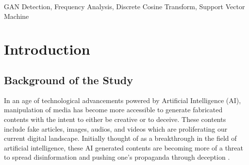 \documentclass[journal]{./IEEE/IEEEtran}
\title{\SPTITLE}
\author{\ADVISEE~and~\ADVISER%
\REMARK
}
\begin{document}
\maketitle

\begin{abstract}
The technological advancement of Generative Adversarial Networks (GANs) has allowed the creation of synthetic images, posing a threat for digital disinformation and media fabrication. Due to this, numerous methods have been proposed to counter GAN-generated media. However, most methods employ deep learning and the use of Convolutional Neural Networks (CNNs), which can be computationally expensive to train. This study proposes frequency analysis through Discrete Cosine Transform (DCT) and Discrete Wavelet Transform (DWT) as distinct pre-processing methods for GAN image classification. Additionally, this study uses a Support Vector Machine (SVM) model to classify fake from real images. To address the limitations of using faces as the primary object class, this study investigates the generalizability of GAN traces in the frequency domain across various object classes using the ProGAN dataset. The study found that using DCT as a pre-processing method provides the most significant performance among the proposed methods, with an accuracy of 97.08\%.
\end{abstract}

\begin{keywords}
GAN Detection, Frequency Analysis, Discrete Cosine Transform, Support Vector Machine
\end{keywords}

\section{Introduction}


\subsection{Background of the Study}
In an age of technological advancements powered by Artificial Intelligence (AI), manipulation of media has become more accessible to generate fabricated contents with the intent to either be creative or to deceive. These contents include fake articles, images, audios, and videos which are proliferating our current digital landscape. Initially thought of as a breakthrough in the field of artificial intelligence, these AI generated contents are becoming more of a threat to spread disinformation and pushing one's propaganda through deception \cite{forbes}.
\end{document}
